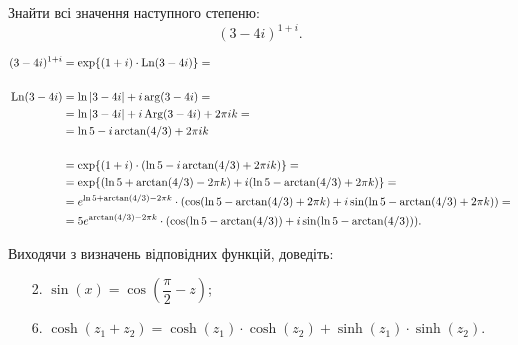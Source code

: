 \begin{problem}[Волковиський, 74.7]
Знайти всі значення наступного степеню: 
\[
(3-4i)^{1+i}.
\]
\end{problem}

\begin{solution}
\begin{align*}
    (3 - 4i) ^ {1 + i} &= \exp \{ (1 + i) \cdot \operatorname{Ln} (3 - 4 i) \} = \\
    \\
    \operatorname{Ln} (3 - 4 i) &= \ln | 3 - 4 i | + i \arg ( 3 - 4 i ) = \\
    &= \ln | 3 - 4 i | + i \operatorname{Arg} ( 3 - 4 i ) + 2 \pi i k = \\
    &= \ln 5 - i \arctan(4 / 3) + 2 \pi i k \\
    \\
    &= \exp \{ (1 + i) \cdot (\ln 5 - i \arctan(4 / 3) + 2 \pi i k) \} = \\
    &= \exp \{ (\ln 5 + \arctan (4 / 3) - 2 \pi k) + i (\ln 5 - \arctan (4 / 3) + 2 \pi k) \} = \\
    &= e^{\ln 5 + \arctan (4/3) - 2 \pi k} \cdot (\cos (\ln 5 - \arctan (4 / 3) + 2 \pi k) + i  \sin (\ln 5 - \arctan (4 / 3) + 2 \pi k)) = \\
    &= 5 e^{\arctan (4/3) - 2 \pi k} \cdot (\cos (\ln 5 - \arctan (4 / 3)) + i \sin (\ln 5 - \arctan (4 / 3))).
\end{align*}
\end{solution}

\begin{problem}[Волковиський, 64]
    Виходячи з визначень відповідних функцій, доведіть:
    \begin{enumerate}
        \item[2.] $\sin (x) = \cos \left( \dfrac \pi 2 - z \right)$;
        \item[6.] $\cosh(z_1 + z_2) = \cosh (z_1) \cdot \cosh (z_2) + \sinh (z_1) \cdot \sinh (z_2)$.
    \end{enumerate}
\end{problem}

